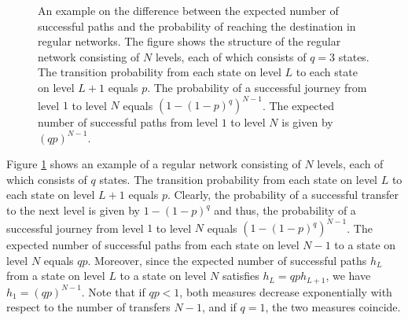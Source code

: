 \documentclass[dissertation,draft*]{aaltoseries}
\begin{document}
\begin{figure}
\caption{An example on the difference between the expected number of successful paths and the probability of reaching the destination in
regular networks.
The figure shows the structure of the regular network consisting of $N$ levels, each of which consists of $q=3$ states. 
The transition probability from each state on level $L$ to each state on level $L+1$ equals $p$. The probability of a successful journey from level $1$ to level $N$
equals $(1-(1-p)^q)^{N-1}$. The expected number of successful paths from level $1$ to level $N$ is given by $(qp)^{N-1}$.
}
\label{regularesimerkki}
\end{figure}

Figure \ref{regularesimerkki} shows an example of a regular network consisting of $N$ levels, each of which consists of $q$ states. 
The transition probability from each state on level $L$ to each state on level $L+1$ equals $p$. Clearly, the probability of 
a successful transfer to the next level is given by $1-(1-p)^q$ and thus, the probability of a successful journey from level $1$ to level $N$
equals ${(1-(1-p)^q)^{N-1}}$. The expected number of successful paths from each state on level $N-1$ to a state on level $N$ equals $qp$.
Moreover, since the expected number of successful paths $h_L$ from a state on level $L$ to a state on level $N$ satisfies 
$h_L = qp h_{L+1}$, we have $h_1 = (qp)^{N-1}$. Note that if $qp < 1$, both measures decrease exponentially with respect to the 
number of transfers $N-1$, and if $q=1$, the two measures coincide.
 
\end{document}
